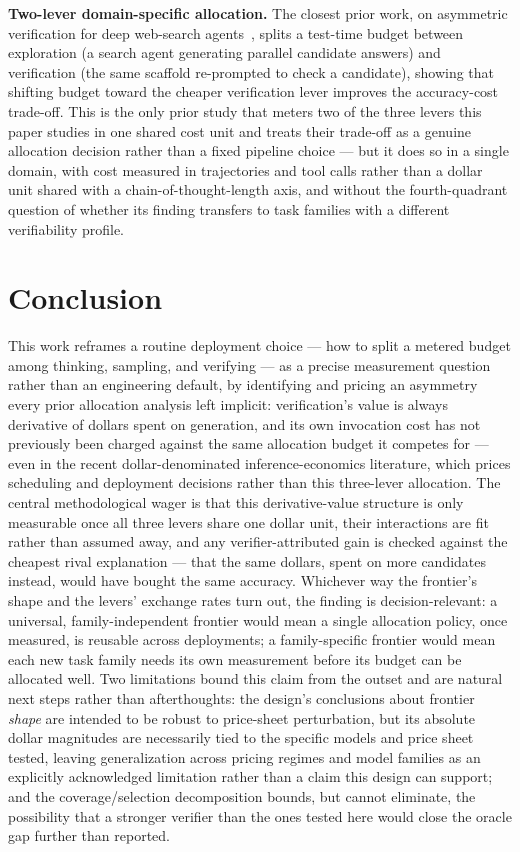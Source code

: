 \documentclass[11pt]{article}
\begin{document}
\textbf{Two-lever domain-specific allocation.} The closest prior work, on asymmetric verification for deep web-search agents~\citep{AsymVerifhxL4}, splits a test-time budget between exploration (a search agent generating parallel candidate answers) and verification (the same scaffold re-prompted to check a candidate), showing that shifting budget toward the cheaper verification lever improves the accuracy-cost trade-off. This is the only prior study that meters two of the three levers this paper studies in one shared cost unit and treats their trade-off as a genuine allocation decision rather than a fixed pipeline choice --- but it does so in a single domain, with cost measured in trajectories and tool calls rather than a dollar unit shared with a chain-of-thought-length axis, and without the fourth-quadrant question of whether its finding transfers to task families with a different verifiability profile.

\section{Conclusion}

This work reframes a routine deployment choice --- how to split a metered budget among thinking, sampling, and verifying --- as a precise measurement question rather than an engineering default, by identifying and pricing an asymmetry every prior allocation analysis left implicit: verification's value is always derivative of dollars spent on generation, and its own invocation cost has not previously been charged against the same allocation budget it competes for --- even in the recent dollar-denominated inference-economics literature, which prices scheduling and deployment decisions rather than this three-lever allocation. The central methodological wager is that this derivative-value structure is only measurable once all three levers share one dollar unit, their interactions are fit rather than assumed away, and any verifier-attributed gain is checked against the cheapest rival explanation --- that the same dollars, spent on more candidates instead, would have bought the same accuracy. Whichever way the frontier's shape and the levers' exchange rates turn out, the finding is decision-relevant: a universal, family-independent frontier would mean a single allocation policy, once measured, is reusable across deployments; a family-specific frontier would mean each new task family needs its own measurement before its budget can be allocated well. Two limitations bound this claim from the outset and are natural next steps rather than afterthoughts: the design's conclusions about frontier \emph{shape} are intended to be robust to price-sheet perturbation, but its absolute dollar magnitudes are necessarily tied to the specific models and price sheet tested, leaving generalization across pricing regimes and model families as an explicitly acknowledged limitation rather than a claim this design can support; and the coverage/selection decomposition bounds, but cannot eliminate, the possibility that a stronger verifier than the ones tested here would close the oracle gap further than reported.
\end{document}
